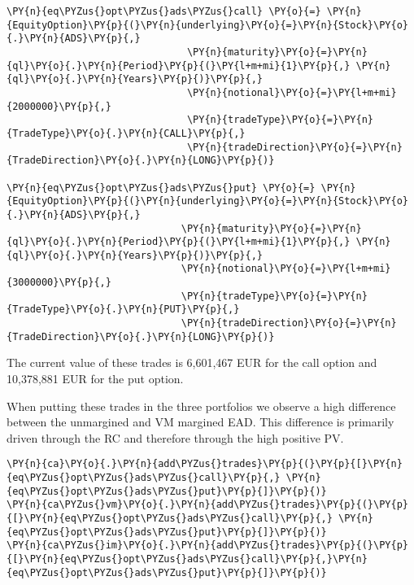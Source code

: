     \begin{tcolorbox}[breakable, size=fbox, boxrule=1pt, pad at break*=1mm,colback=cellbackground, colframe=cellborder]
\begin{Verbatim}[commandchars=\\\{\}]
\PY{n}{eq\PYZus{}opt\PYZus{}ads\PYZus{}call} \PY{o}{=} \PY{n}{EquityOption}\PY{p}{(}\PY{n}{underlying}\PY{o}{=}\PY{n}{Stock}\PY{o}{.}\PY{n}{ADS}\PY{p}{,}
                               \PY{n}{maturity}\PY{o}{=}\PY{n}{ql}\PY{o}{.}\PY{n}{Period}\PY{p}{(}\PY{l+m+mi}{1}\PY{p}{,} \PY{n}{ql}\PY{o}{.}\PY{n}{Years}\PY{p}{)}\PY{p}{,}
                               \PY{n}{notional}\PY{o}{=}\PY{l+m+mi}{2000000}\PY{p}{,}
                               \PY{n}{tradeType}\PY{o}{=}\PY{n}{TradeType}\PY{o}{.}\PY{n}{CALL}\PY{p}{,}
                               \PY{n}{tradeDirection}\PY{o}{=}\PY{n}{TradeDirection}\PY{o}{.}\PY{n}{LONG}\PY{p}{)}

\PY{n}{eq\PYZus{}opt\PYZus{}ads\PYZus{}put} \PY{o}{=} \PY{n}{EquityOption}\PY{p}{(}\PY{n}{underlying}\PY{o}{=}\PY{n}{Stock}\PY{o}{.}\PY{n}{ADS}\PY{p}{,}
                              \PY{n}{maturity}\PY{o}{=}\PY{n}{ql}\PY{o}{.}\PY{n}{Period}\PY{p}{(}\PY{l+m+mi}{1}\PY{p}{,} \PY{n}{ql}\PY{o}{.}\PY{n}{Years}\PY{p}{)}\PY{p}{,}
                              \PY{n}{notional}\PY{o}{=}\PY{l+m+mi}{3000000}\PY{p}{,}
                              \PY{n}{tradeType}\PY{o}{=}\PY{n}{TradeType}\PY{o}{.}\PY{n}{PUT}\PY{p}{,}
                              \PY{n}{tradeDirection}\PY{o}{=}\PY{n}{TradeDirection}\PY{o}{.}\PY{n}{LONG}\PY{p}{)}
\end{Verbatim}
\end{tcolorbox}

    The current value of these trades is 6,601,467 EUR for the call option
and 10,378,881 EUR for the put option.

    
    When putting these trades in the three portfolios we observe a high
difference between the unmargined and VM margined EAD. This difference
is primarily driven through the RC and therefore through the high
positive PV.

    \begin{tcolorbox}[breakable, size=fbox, boxrule=1pt, pad at break*=1mm,colback=cellbackground, colframe=cellborder]
\begin{Verbatim}[commandchars=\\\{\}]
\PY{n}{ca}\PY{o}{.}\PY{n}{add\PYZus{}trades}\PY{p}{(}\PY{p}{[}\PY{n}{eq\PYZus{}opt\PYZus{}ads\PYZus{}call}\PY{p}{,} \PY{n}{eq\PYZus{}opt\PYZus{}ads\PYZus{}put}\PY{p}{]}\PY{p}{)}
\PY{n}{ca\PYZus{}vm}\PY{o}{.}\PY{n}{add\PYZus{}trades}\PY{p}{(}\PY{p}{[}\PY{n}{eq\PYZus{}opt\PYZus{}ads\PYZus{}call}\PY{p}{,} \PY{n}{eq\PYZus{}opt\PYZus{}ads\PYZus{}put}\PY{p}{]}\PY{p}{)}
\PY{n}{ca\PYZus{}im}\PY{o}{.}\PY{n}{add\PYZus{}trades}\PY{p}{(}\PY{p}{[}\PY{n}{eq\PYZus{}opt\PYZus{}ads\PYZus{}call}\PY{p}{,}\PY{n}{eq\PYZus{}opt\PYZus{}ads\PYZus{}put}\PY{p}{]}\PY{p}{)}
\end{Verbatim}
\end{tcolorbox}

